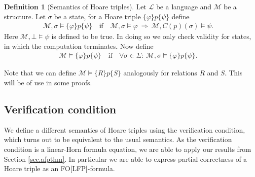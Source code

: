 \documentclass[acmsmall]{acmart}
\theoremstyle{plain}
\theoremstyle{definition}
\newtheorem{definition}[theorem]{Definition}
\newcommand{\calL}{\mathcal{L}}
\newcommand{\calM}{\mathcal{M}}
\newcommand{\hoare}[3]{\{#1\}#2\{#3\}}
\begin{document}
\begin{definition}[Semantics of Hoare triples]
	Let $\calL$ be a language and $\calM$ be a structure. Let $\sigma$ be a state, for a Hoare triple $\hoare{\varphi}{p}{\psi}$ define 
	\begin{align*}
		\calM, \sigma \models \hoare{\varphi}{p}{\psi} \quad \text{if} \quad  \calM,\sigma \models \varphi ~\Rightarrow~ \calM,C(p)(\sigma) \models \psi.
	\end{align*}
	Here $\calM,\bot \models \psi$ is defined to be true. In doing so we only check validity for states, in which the computation terminates. Now define
	\begin{align*}
		\calM \models \hoare{\varphi}{p}{\psi} \quad \text{if} \quad
		\forall \sigma \in \Sigma:\ \calM,\sigma \models \hoare{\varphi}{p}{\psi}.
	\end{align*}

Note that we can define $\calM \models \hoare{R}{p}{S}$ analogously for relations $R$ and $S$. This will be of use in some proofs.

\end{definition}


\subsection{Verification condition}

We define a different semantics of Hoare triples using the verification condition, which turns out to be equivalent to the usual semantics. As the verification condition is a linear-Horn formula equation, we are able to apply our results from Section \ref{sec.afpthm}. In particular we are able to express partial correctness of a Hoare triple as an FO[LFP]-formula.
\end{document}
